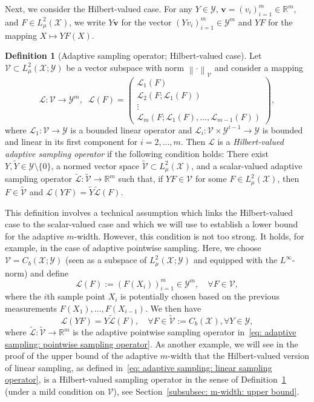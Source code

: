 \documentclass[namedate,webpdf]{ima-authoring-template-blank}
\newcommand*{\nm}[1]{{\left\|#1\right \|}}
\newcounter{counter}
\numberwithin{counter}{section}
\numberwithin{equation}{section}
\theoremstyle{plain}
\theoremstyle{definition}
\newtheorem{definition}[counter]{Definition}
\newcommand*{\cL}{\mathcal{L}}
\newcommand*{\cV}{\mathcal{V}}
\newcommand*{\cX}{\mathcal{X}}
\newcommand*{\cY}{\mathcal{Y}}
\newcommand*{\bbR}{\mathbb{R}}
\newcommand*{\wtY}{\widetilde{Y}}
\theoremstyle{thmstyletwo}
\begin{document}
Next, we consider the Hilbert-valued case. For any \(Y \in \cY\), \(\bm{v} = (v_i)_{i = 1}^m \in \bbR^m\), and \(F \in L_{\mu}^2(\cX)\), we write \(Y \bm{v}\) for the vector \((Y v_i)_{i = 1}^m \in \cY^m\) and \(Y F\) for the mapping \(X \mapsto Y F(X)\). 

\begin{definition}[{Adaptive sampling operator; Hilbert-valued case}]
\label{def: adaptive sampling operator; Hilbert-valued}
    Let \(\cV \subset L_{\mu}^2(\cX; \cY)\) be a vector subspace with norm \(\nm{\cdot}_{\cV}\) and consider a mapping
    \[
    \cL: \cV \to \cY^m, \;\; \cL(F) = 
    \begin{pmatrix}
        \cL_1(F) \\
        \cL_2(F; \cL_1(F))\\
        \vdots\\
        \cL_m(F; \cL_1(F), \dots, \cL_{m-1}(F))
    \end{pmatrix},
    \]
    where \(\cL_1: \cV \to \cY\) is a bounded linear operator and \(\cL_i: \cV \times \cY^{i-1} \to \cY\) is bounded and linear in its first component for \(i = 2, \dots, m\). Then \(\cL\) is a \emph{Hilbert-valued adaptive sampling operator} if the following condition holds: There exist \(Y, \wtY \in \cY \setminus \{0\}\), a normed vector space \(\widetilde{\cV} \subset L_{\mu}^2(\cX)\), and a scalar-valued adaptive sampling operator \(\widetilde{\cL}: \widetilde{\cV} \to \bbR^m\) such that, if \(Y F \in \cV\) for some \(F \in L_{\mu}^2(\cX)\), then \(F \in \widetilde{\cV}\) and  \(\cL(Y F) = \wtY \widetilde{\cL}(F)\).
\end{definition}

This definition involves a technical assumption which links the Hilbert-valued case to the scalar-valued case and which we will use to establish a lower bound for the adaptive \(m\)-width. However, this condition is not too strong. It holds, for example, in the case of adaptive pointwise sampling. Here, we choose \(\cV = C_b(\cX; \cY)\) (seen as a subspace of \(L_{\mu}^2(\cX; \cY)\) and equipped with the \(L^{\infty}\)-norm) and define
\[
\cL(F) := \left(F(X_i)\right)_{i = 1}^m \in \cY^m, \quad \forall F \in \cV,
\]
where the \(i\)th sample point \(X_i\) is potentially chosen based on the previous measurements \(F(X_1),\dots,F(X_{i-1})\). We then have
\[
\cL(YF) = Y \widetilde{\cL}(F), \quad \forall F \in \widetilde{\cV} := C_b(\cX), \forall Y \in \cY,
\]
where \(\widetilde{\cL}: \widetilde{\cV} \to \bbR^m\) is the adaptive pointwise sampling operator in~\eqref{eq: adaptive sampling: pointwise sampling operator}. 
As another example, we will see in the proof of the upper bound of the adaptive \(m\)-width that the Hilbert-valued version of linear sampling, as defined in~\eqref{eq: adaptive sampling: linear sampling operator}, is a Hilbert-valued sampling operator in the sense of Definition~\ref{def: adaptive sampling operator; Hilbert-valued} (under a mild condition on \(\cV\)), see Section~\ref{subsubsec: m-width: upper bound}.
\end{document}
